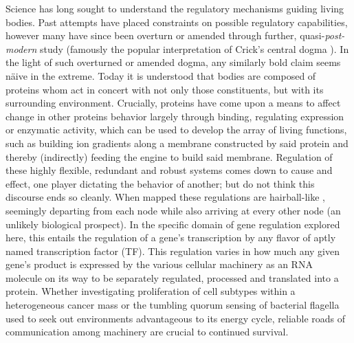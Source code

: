 Science has long sought to understand the regulatory mechanisms guiding living bodies. Past attempts have placed constraints on possible regulatory capabilities, however many have since been overturn or amended through further, quasi-\emph{post-modern} study (famously the popular interpretation of Crick's central dogma \cite{crick1958protein}). In the light of such overturned or amended dogma, any similarly bold claim seems n\"{a}ive in the extreme. Today it is understood that bodies are composed of proteins whom act in concert with not only those constituents, but with its surrounding environment. Crucially, proteins have come upon a means to affect change in other proteins behavior largely through binding, \eg regulating expression or enzymatic activity, which can be used to develop the array of living functions, such as building ion gradients along a membrane constructed by said protein and thereby (indirectly) feeding the engine to build said membrane. Regulation of these highly flexible, redundant and robust systems comes down to cause and effect, \ie one player dictating the behavior of another; but do not think this discourse ends so cleanly. When mapped these regulations are hairball-like \cite{schulz2013grooming}, seemingly departing from each node while also arriving at every other node (an unlikely biological prospect). In the specific domain of gene regulation explored here, this entails the regulation of a gene's transcription by any flavor of aptly named transcription factor (TF). This regulation varies in how much any given gene's product is expressed by the various cellular machinery as an RNA molecule on its way to be separately regulated, processed and translated into a protein. Whether investigating proliferation of cell subtypes within a heterogeneous cancer mass or the tumbling quorum sensing of bacterial flagella used to seek out environments advantageous to its energy cycle, reliable roads of communication among machinery are crucial to continued survival.

